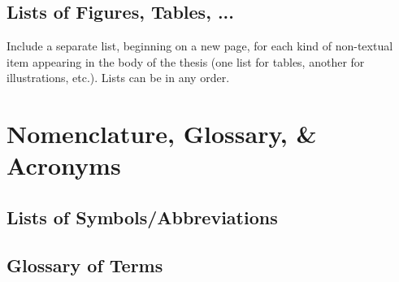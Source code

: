 
		\subsection{Lists of Figures, Tables, ...}\label{listsof}
			Include a separate list, beginning on a new page, for each kind of non-textual item appearing in the body of the thesis (one list for tables, another for illustrations, etc.). Lists can be in any order.  

	\section{Nomenclature, Glossary, \& Acronyms}\label{nomenclature}\label{glossary}\label{acronyms}
		\subsection{Lists of Symbols/Abbreviations}
			

		\subsection{Glossary of Terms}
			

